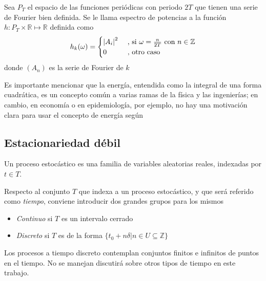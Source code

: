 \begin{definicion}
Sea $P_T$ el espacio de las funciones peri\'odicas con periodo $2T$ que tienen una serie de Fourier 
bien definida. Se le llama espectro de potencias a la funci\'on 
$h: P_T \times \mathbb{R} \mapsto \mathbb{R}$ definida como
\begin{equation*}
h_k(\omega) = 
\begin{cases}
\left| A_i \right|^{2} & \text{ , si } \omega = \frac{n}{2T} \text{   con } n\in \mathbb{Z} \\
0 & \text{ ,  otro caso}
\end{cases}
\end{equation*}
donde $\left( A_n \right)$ es la serie de Fourier de $k$
\label{espec}
\end{definicion}

Es importante mencionar que la energ\'ia, entendida como la integral de una forma cuadr\'atica, es 
un concepto com\'un a varias ramas de la f\'isica y las ingenier\'ias; en cambio, en econom\'ia o 
en epidemiolog\'ia, por ejemplo, no hay una motivaci\'on clara para usar el concepto de energ\'ia 
seg\'un %


\subsection{Estacionariedad débil}

\begin{definicion}
Un proceso estoc\'astico \xt es una familia de variables aleatorias reales, 
indexadas por $t \in T$.
\label{proc_estocastico}
\end{definicion}

Respecto al conjunto $T$ que indexa a un proceso estoc\'astico, y que ser\'a referido como 
\textit{tiempo}, conviene introducir dos grandes grupos para los mismos
\begin{itemize}
\item \textit{Continuo} si $T$ es un intervalo cerrado
\item \textit{Discreto} si $T$ es de la forma 
$\{ t_0 + n \delta \lvert n \in U \subseteq \mathbb{Z} \}$
\end{itemize}

Los procesos a tiempo discreto contemplan conjuntos finitos e infinitos de puntos en el tiempo.
No se manejan discutir\'a sobre otros tipos de tiempo en este trabajo.

